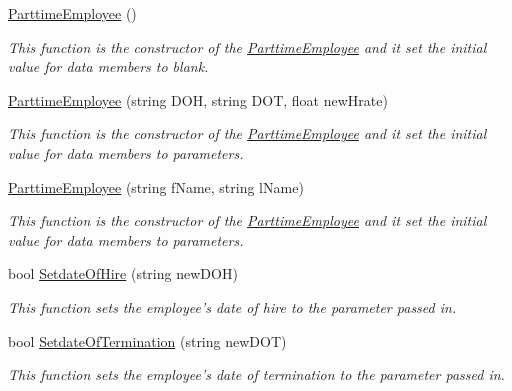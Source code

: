 \begin{DoxyCompactItemize}
\item 
\hyperlink{class_all_employees_1_1_parttime_employee_aefdb20ed1cc9fb007068380a97e3f51e}{Parttime\-Employee} ()
\begin{DoxyCompactList}\small\item\em This function is the constructor of the \hyperlink{class_all_employees_1_1_parttime_employee}{Parttime\-Employee} and it set the initial value for data members to blank. \end{DoxyCompactList}\item 
\hyperlink{class_all_employees_1_1_parttime_employee_abb02ce0fa7b9a9b81cc379dc8f93a7a7}{Parttime\-Employee} (string D\-O\-H, string D\-O\-T, float new\-Hrate)
\begin{DoxyCompactList}\small\item\em This function is the constructor of the \hyperlink{class_all_employees_1_1_parttime_employee}{Parttime\-Employee} and it set the initial value for data members to parameters. \end{DoxyCompactList}\item 
\hyperlink{class_all_employees_1_1_parttime_employee_a16b95043eafc2abb949944f8f389271d}{Parttime\-Employee} (string f\-Name, string l\-Name)
\begin{DoxyCompactList}\small\item\em This function is the constructor of the \hyperlink{class_all_employees_1_1_parttime_employee}{Parttime\-Employee} and it set the initial value for data members to parameters. \end{DoxyCompactList}\item 
bool \hyperlink{class_all_employees_1_1_parttime_employee_ab743e92c565b399cbce2a33967258d1e}{Setdate\-Of\-Hire} (string new\-D\-O\-H)
\begin{DoxyCompactList}\small\item\em This function sets the employee's date of hire to the parameter passed in. \end{DoxyCompactList}\item 
bool \hyperlink{class_all_employees_1_1_parttime_employee_a95079859a476d68825b1fb6529ed94a6}{Setdate\-Of\-Termination} (string new\-D\-O\-T)
\begin{DoxyCompactList}\small\item\em This function sets the employee's date of termination to the parameter passed in. \end{DoxyCompactList}\item 

\end{DoxyCompactItemize}
